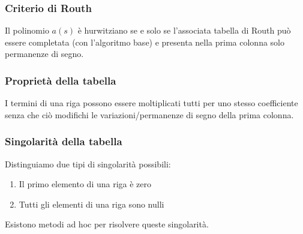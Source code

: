 \documentclass[11pt]{article}
\begin{document}
\subsubsection{Criterio di Routh}
Il polinomio $a(s)$ è hurwitziano se e solo se l'associata tabella di Routh può essere completata (con l'algoritmo base) e presenta nella prima colonna solo permanenze di segno.
\subsubsection{Proprietà della tabella}
I termini di una riga possono essere moltiplicati tutti per uno stesso coefficiente senza che ciò modifichi le variazioni/permanenze di segno della prima colonna.
\subsubsection{Singolarità della tabella}
Distinguiamo due tipi di singolarità possibili:
\begin{enumerate}
    \item Il primo elemento di una riga è zero
    \item Tutti gli elementi di una riga sono nulli
\end{enumerate}
Esistono metodi ad hoc per risolvere queste singolarità.
\end{document}
